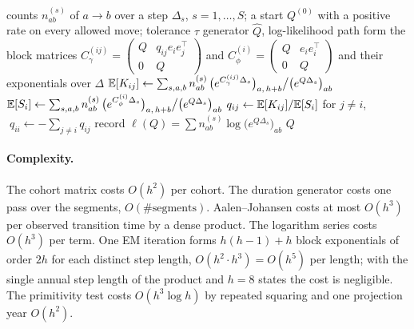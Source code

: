 \begin{algorithm}[htbp]
\caption{EM estimate of a generator from annual snapshot counts.}
\label{alg:ratings-em}
\begin{algorithmic}[1]
\Require counts $n^{(s)}_{ab}$ of $a\to b$ over a step $\Delta_s$, $s=1,\dots,S$; a start $Q^{(0)}$ with a positive rate on every allowed move; tolerance $\tau$
\Ensure generator $\hat Q$, log-likelihood path
\Repeat
    \State form the block matrices $C_\gamma^{(ij)}=\begin{pmatrix}Q&q_{ij}e_ie_j^{\top}\\0&Q\end{pmatrix}$ and $C_\phi^{(i)}=\begin{pmatrix}Q&e_ie_i^{\top}\\0&Q\end{pmatrix}$ and their exponentials over $\Delta$
  \EndFor
  \State $\mathbb{E}[K_{ij}]\gets\sum_{s,a,b}n^{(s)}_{ab}\,\bigl(e^{C_\gamma^{(ij)}\Delta_s}\bigr)_{a,\,h+b}\big/\bigl(e^{Q\Delta_s}\bigr)_{ab}$ 
  \State $\mathbb{E}[S_i]\gets\sum_{s,a,b}n^{(s)}_{ab}\,\bigl(e^{C_\phi^{(i)}\Delta_s}\bigr)_{a,\,h+b}\big/\bigl(e^{Q\Delta_s}\bigr)_{ab}$ 
  \State $q_{ij}\gets\mathbb{E}[K_{ij}]/\mathbb{E}[S_i]$ for $j\ne i$, $\;q_{ii}\gets-\sum_{j\ne i}q_{ij}$ 
  \State record $\ell(Q)=\sum n^{(s)}_{ab}\log\bigl(e^{Q\Delta_s}\bigr)_{ab}$
\State \Return $Q$
\end{algorithmic}
\end{algorithm}

\paragraph{Complexity.} The cohort matrix costs $O(h^2)$ per cohort. The duration generator costs one pass over the segments, $O(\#\text{segments})$. Aalen--Johansen costs at most $O(h^3)$ per observed transition time by a dense product. The logarithm series costs $O(h^3)$ per term. One EM iteration forms $h(h-1)+h$ block exponentials of order $2h$ for each distinct step length, $O(h^2\cdot h^3)=O(h^5)$ per length; with the single annual step length of the product and $h=8$ states the cost is negligible. The primitivity test costs $O(h^3\log h)$ by repeated squaring and one projection year $O(h^2)$.

